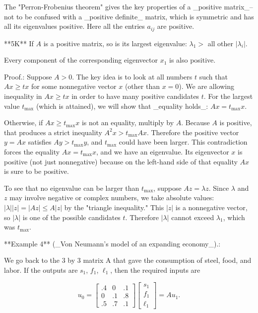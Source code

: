 The "Perron-Frobenius theorem" gives the key properties of a _positive matrix_--not to be confused with a _positive definite_ matrix, which is symmetric and has all its eigenvalues positive. Here all the entries \(a_{ij}\) are positive.

**5K** If \(A\) is a positive matrix, so is its largest eigenvalue: \(\lambda_{1}>\) all other \(|\lambda_{i}|\).

Every component of the corresponding eigenvector \(x_{1}\) is also positive.

Proof.: Suppose \(A>0\). The key idea is to look at all numbers \(t\) such that \(Ax\geq tx\) for some nonnegative vector \(x\) (other than \(x=0\)). We are allowing inequality in \(Ax\geq tx\) in order to have many positive candidates \(t\). For the largest value \(t_{\max}\) (which is attained), we will show that _equality holds_: \(Ax=t_{\max}x\).

Otherwise, if \(Ax\geq t_{\max}x\) is not an equality, multiply by \(A\). Because \(A\) is positive, that produces a strict inequality \(A^{2}x>t_{\max}Ax\). Therefore the positive vector \(y=Ax\) satisfies \(Ay>t_{\max}y\), and \(t_{\max}\) could have been larger. This contradiction forces the equality \(Ax=t_{\max}x\), and we have an eigenvalue. Its eigenvector \(x\) is positive (not just nonnegative) because on the left-hand side of that equality \(Ax\) is sure to be positive.

To see that no eigenvalue can be larger than \(t_{\max}\), suppose \(Az=\lambda z\). Since \(\lambda\) and \(z\) may involve negative or complex numbers, we take absolute values: \(|\lambda||z|=|Az|\leq A|z|\) by the "triangle inequality." This \(|z|\) is a nonnegative vector, so \(|\lambda|\) is one of the possible candidates \(t\). Therefore \(|\lambda|\) cannot exceed \(\lambda_{1}\), which was \(t_{\max}\). 

**Example 4** (_Von Neumann's model of an expanding economy_).:

We go back to the 3 by 3 matrix A that gave the consumption of steel, food, and labor. If the outputs are \(s_{1}\), \(f_{1}\), \(\ell_{1}\), then the required inputs are

\[u_{0}=\begin{bmatrix}.4&0&.1\\ 0&.1&.8\\ .5&.7&.1\end{bmatrix}\begin{bmatrix}s_{1}\\ f_{1}\\ \ell_{1}\end{bmatrix}=Au_{1}.\]

